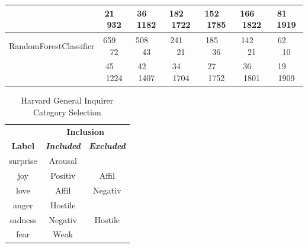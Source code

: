 \documentclass[conference]{IEEEtran}
\begin{document}
\begin{table}[htbp]
\begin{center}
\begin{tabular}{|c|c|c|c|c|c|c|}
 & 21$\;$$\;$$\;$$\;$932 & 36$\;$$\;$$\;$$\;$1182 & 182$\;$$\;$$\;$$\;$1722 & 152$\;$$\;$$\;$$\;$1785 & 166$\;$$\;$$\;$$\;$1822 & 81$\;$$\;$$\;$$\;$1919 \\ 
\hline
RandomForestClassifier & 659$\;$$\;$$\;$$\;$72 & 508$\;$$\;$$\;$$\;$43 & 241$\;$$\;$$\;$$\;$21 & 185$\;$$\;$$\;$$\;$36 & 142$\;$$\;$$\;$$\;$21 & 62$\;$$\;$$\;$$\;$10 \\ 

 & 45$\;$$\;$$\;$$\;$1224 & 42$\;$$\;$$\;$$\;$1407 & 34$\;$$\;$$\;$$\;$1704 & 27$\;$$\;$$\;$$\;$1752 & 36$\;$$\;$$\;$$\;$1801 & 19$\;$$\;$$\;$$\;$1909 \\ 
\hline
\end{tabular}
\label{taba2}
\end{center}
\end{table}

\begin{table}[htbp]
\caption{Harvard General Inquirer Category Selection}
\begin{center}
\begin{tabular}{|c|c|c|}
\hline
\textbf{}&\multicolumn{2}{|c|}{\textbf{Inclusion}} \\ 
\cline{2-3}
\textbf{Label} & \textbf{\textit{Included}}& \textbf{\textit{Excluded}} \\
\hline
surprise & Arousal & \\
\hline
joy & Positiv & Affil \\
\hline
love & Affil & Negativ\\
\hline
anger & Hostile & \\
\hline
sadness & Negativ & Hostile\\
\hline
fear & Weak & \\
\hline
\end{tabular}
\label{taba3}
\end{center}
\end{table}

\label{FirstAppendix}
\end{document}
